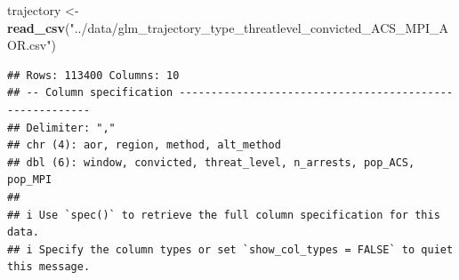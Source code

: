 \documentclass[
]{article}
\newenvironment{Shaded}{\begin{snugshade}}{\end{snugshade}}
\newcommand{\AttributeTok}[1]{\textcolor[rgb]{0.13,0.29,0.53}{#1}}
\newcommand{\CommentTok}[1]{\textcolor[rgb]{0.56,0.35,0.01}{\textit{#1}}}
\newcommand{\ConstantTok}[1]{\textcolor[rgb]{0.56,0.35,0.01}{#1}}
\newcommand{\ControlFlowTok}[1]{\textcolor[rgb]{0.13,0.29,0.53}{\textbf{#1}}}
\newcommand{\FunctionTok}[1]{\textcolor[rgb]{0.13,0.29,0.53}{\textbf{#1}}}
\newcommand{\NormalTok}[1]{#1}
\newcommand{\OtherTok}[1]{\textcolor[rgb]{0.56,0.35,0.01}{#1}}
\newcommand{\SpecialCharTok}[1]{\textcolor[rgb]{0.81,0.36,0.00}{\textbf{#1}}}
\newcommand{\StringTok}[1]{\textcolor[rgb]{0.31,0.60,0.02}{#1}}
\begin{document}
\begin{Shaded}
\end{Shaded}

\begin{Shaded}
\begin{Highlighting}[]
\NormalTok{trajectory }\OtherTok{\textless{}{-}} \FunctionTok{read\_csv}\NormalTok{(}\StringTok{"../data/glm\_trajectory\_type\_threatlevel\_convicted\_ACS\_MPI\_AOR.csv"}\NormalTok{) }
\end{Highlighting}
\end{Shaded}

\begin{verbatim}
## Rows: 113400 Columns: 10
## -- Column specification --------------------------------------------------------
## Delimiter: ","
## chr (4): aor, region, method, alt_method
## dbl (6): window, convicted, threat_level, n_arrests, pop_ACS, pop_MPI
## 
## i Use `spec()` to retrieve the full column specification for this data.
## i Specify the column types or set `show_col_types = FALSE` to quiet this message.
\end{verbatim}
\end{document}
